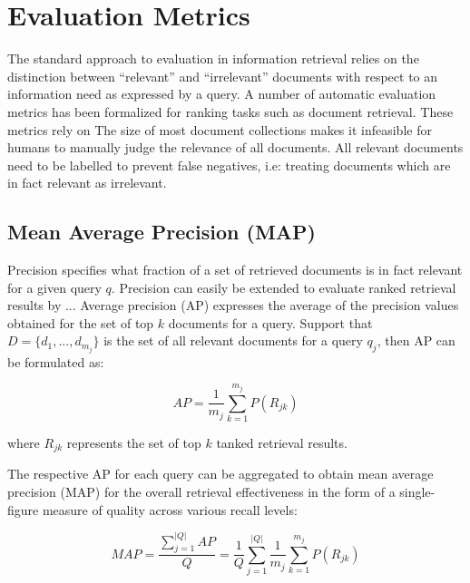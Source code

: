 \section{Evaluation Metrics}

The standard approach to evaluation in information retrieval relies on the distinction between ``relevant'' and ``irrelevant'' documents with respect to an information need as expressed by a query.
A number of automatic evaluation metrics has been formalized for ranking tasks such as document retrieval.
These metrics rely on 
The size of most document collections makes it infeasible for humans to manually judge the relevance of all documents.
All relevant documents need to be labelled to prevent false negatives, i.e: treating documents which are in fact relevant as irrelevant.

\subsection{Mean Average Precision (MAP)}

Precision specifies what fraction of a set of retrieved documents is in fact relevant for a given query $ q $.
Precision can easily be extended to evaluate ranked retrieval results by ...
Average precision (AP) expresses the average of the precision values obtained for the set of top $ k $ documents for a query.
Support that $ D = \{d_1, ..., d_{m_j}\} $ is the set of all relevant documents for a query $ q_j $, then AP can be formulated as:

\begin{equation}
AP = \frac{1}{m_j} \sum^{m_j} _{k = 1} P(R_{jk})
\end{equation}

where $ R_{jk} $ represents the set of top $ k $ tanked retrieval results.

The respective AP for each query can be aggregated to obtain mean average precision (MAP) for the overall retrieval effectiveness in the form of a single-figure measure of quality across various recall levels:

\begin{equation}
MAP = \frac{\sum^{|Q|} _{j = 1} AP}{Q} = \frac{1}{Q} \sum^{|Q|} _{j = 1} \frac{1}{m_j} \sum^{m_j} _{k = 1} P(R_{jk})
\end{equation}


